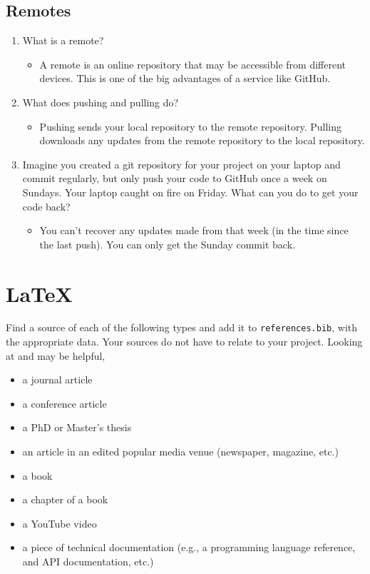\documentclass[10pt,twocolumn]{article}
\begin{document}
\subsection{Remotes}

\begin{enumerate}
    \item What is a remote?
        \begin{itemize}
            \item A remote is an online repository that may be accessible from different devices. This is one of the big advantages of a service like GitHub.
        \end{itemize}
    \item What does pushing and pulling do?
        \begin{itemize}
            \item Pushing sends your local repository to the remote repository. Pulling downloads any updates from the remote repository to the local repository.
        \end{itemize}
    \item Imagine you created a git repository for your project on your laptop and commit regularly, but only push your code to GitHub once a week on Sundays. Your laptop caught on fire on Friday. What can you do to get your code back?
        \begin{itemize}
            \item You can't recover any updates made from that week (in the time since the last push). You can only get the Sunday commit back.
        \end{itemize}
\end{enumerate}

\section{\LaTeX}

Find a source of each of the following types and add it to \texttt{references.bib}, with the appropriate data. Your sources do not have to relate to your project. Looking at \textcite{OverleafBibliographyManagement} and \textcite{WikipediaBibtex} may be helpful,

\begin{itemize}
    \item a journal article \cite{Journal}
    \item a conference article \cite{Conference}
    \item a PhD or Master's thesis \cite{PhD}
    \item an article in an edited popular media venue (newspaper, magazine, etc.) \cite{Magazine}
    \item a book \cite{Book}
    \item a chapter of a book \cite{Chapter}
    \item a YouTube video \cite{Video}
    \item a piece of technical documentation (e.g., a programming language reference, and API documentation, etc.) \cite{Documentation}
\end{itemize}
\end{document}
